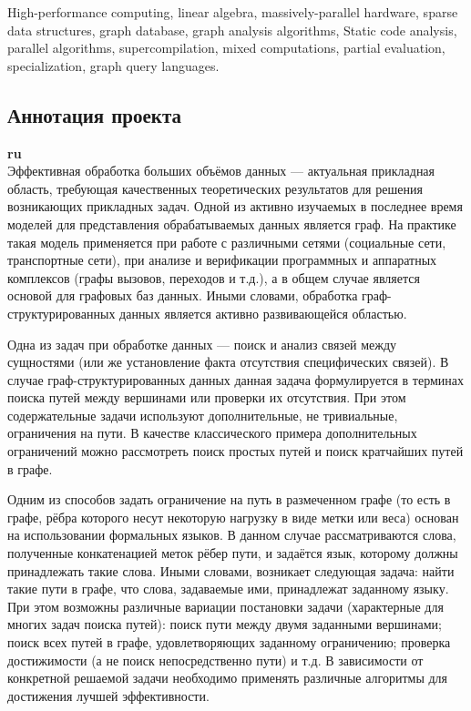 \documentclass[12pt]{article}  %
\theoremstyle{remark}
\begin{document}
High-performance computing, linear algebra, massively-parallel hardware, sparse data structures, graph database, graph analysis algorithms, Static code analysis, parallel algorithms, supercompilation, mixed computations, partial evaluation, specialization, graph query languages.



\subsection{Аннотация проекта}
\textbf{ru}\\
%
Эффективная обработка больших объёмов данных — актуальная прикладная область, требующая качественных теоретических результатов для решения возникающих прикладных задач. Одной из активно изучаемых в последнее время моделей для представления обрабатываемых данных является граф. На практике такая модель применяется при работе с различными сетями (социальные сети, транспортные сети), при анализе и верификации программных и аппаратных комплексов (графы вызовов, переходов и т.д.), а в общем случае является основой для графовых баз данных. Иными словами, обработка граф-структурированных данных является активно развивающейся областью.

Одна из задач при обработке данных — поиск и анализ связей между сущностями (или же установление факта отсутствия специфических связей). В случае граф-структурированных данных данная задача формулируется в терминах поиска путей между вершинами или проверки их отсутствия. При этом содержательные задачи используют дополнительные, не тривиальные, ограничения на пути. В качестве классического примера дополнительных ограничений можно рассмотреть поиск простых путей и поиск кратчайших путей в графе.

Одним из способов задать ограничение на путь в размеченном графе (то есть в графе, рёбра которого несут некоторую нагрузку в виде метки или веса) основан на использовании формальных языков. В данном случае рассматриваются слова, полученные конкатенацией меток рёбер пути, и задаётся язык, которому должны принадлежать такие слова. Иными словами, возникает следующая задача: найти такие пути в графе, что слова, задаваемые ими, принадлежат заданному языку. При этом возможны различные вариации постановки задачи (характерные для многих задач поиска путей): поиск пути между двумя заданными вершинами; поиск всех путей в графе, удовлетворяющих заданному ограничению; проверка достижимости (а не поиск непосредственно пути) и т.д. В зависимости от конкретной решаемой задачи необходимо применять различные алгоритмы для достижения лучшей эффективности.
\end{document}
